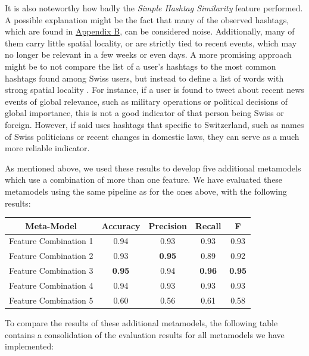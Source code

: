 \documentclass[10pt,a4paper]{article}
\begin{document}
It is also noteworthy how badly the \textit{Simple Hashtag Similarity} feature performed. A possible explanation might be the fact that many of the observed hashtags, which are found in \hyperref[sec:appendix-hashtags]{Appendix B}, can be considered noise. Additionally, many of them carry little spatial locality, or are strictly tied to recent events, which may no longer be relevant in a few weeks or even days. A more promising approach might be to not compare the list of a user's hashtags to the most common hashtags found among Swiss users, but instead to define a list of words with strong spatial locality \cite{ryoo14a}. For instance, if a user is found to tweet about recent news events of global relevance, such as military operations or political decisions of global importance, this is not a good indicator of that person being Swiss or foreign. However, if said uses hashtags that specific to Switzerland, such as names of Swiss politicians or recent changes in domestic laws, they can serve as a much more reliable indicator.

As mentioned above, we used these results to develop five additional metamodels which use a combination of more than one feature. We have evaluated these metamodels using the same pipeline as for the ones above, with the following results:

\begin{center}
\begin{tabular}{ |c|c|c|c|c| }
\hline
\textbf{Meta-Model} & \textbf{Accuracy} & \textbf{Precision} & \textbf{Recall} & \textbf{F} \\
\hline
Feature Combination 1 & 0.94 & 0.93 & 0.93 & 0.93 \\
\hline
Feature Combination 2 & 0.93 & \textbf{0.95} & 0.89 & 0.92 \\
\hline
Feature Combination 3 & \textbf{0.95} & 0.94 & \textbf{0.96} & \textbf{0.95} \\
\hline
Feature Combination 4 & 0.94 & 0.93 & 0.93 & 0.93 \\
\hline
Feature Combination 5 & 0.60 & 0.56 & 0.61 & 0.58 \\
\hline
\end{tabular}
\end{center}

To compare the results of these additional metamodels, the following table contains a consolidation of the evaluation results for all metamodels we have implemented:
\end{document}
